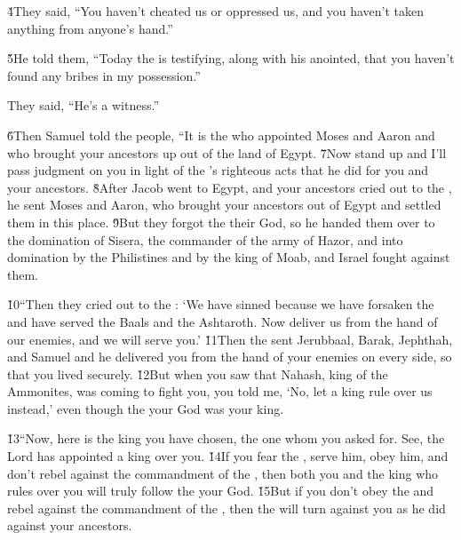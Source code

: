 \v{4}They said, ``You haven't cheated us or oppressed us, and you haven't taken anything from anyone's hand.''

\v{5}He told them, ``Today the  is testifying, along with his anointed, that you haven't found any bribes in my possession.''

They said, ``He's a witness.''

\v{6}Then Samuel told the people, ``It is the  who appointed Moses and Aaron and who brought your ancestors up out of the land of Egypt. \v{7}Now stand up and I'll pass judgment on you in light of the 's righteous acts that he did for you and your ancestors. \v{8}After Jacob went to Egypt, and your ancestors cried out to the , he sent Moses and Aaron, who brought your ancestors out of Egypt and settled them in this place. \v{9}But they forgot the  their God, so he handed them over to the domination of Sisera, the commander of the army of Hazor, and into domination by the Philistines and by the king of Moab, and Israel fought against them.

\v{10}``Then they cried out to the : `We have sinned because we have forsaken the  and have served the Baals and the Ashtaroth. Now deliver us from the hand of our enemies, and we will serve you.' \v{11}Then the  sent Jerubbaal, Barak, Jephthah, and Samuel and he delivered you from the hand of your enemies on every side, so that you lived securely. \v{12}But when you saw that Nahash, king of the Ammonites, was coming to fight you, you told me, `No, let a king rule over us instead,' even though the  your God was your king.

\v{13}``Now, here is the king you have chosen, the one whom you asked for. See, the Lord has appointed a king over you. \v{14}If you fear the , serve him, obey him, and don't rebel against the commandment of the , then both you and the king who rules over you will truly follow the  your God. \v{15}But if you don't obey the  and rebel against the commandment of the , then the  will turn against you as he did against your ancestors.

